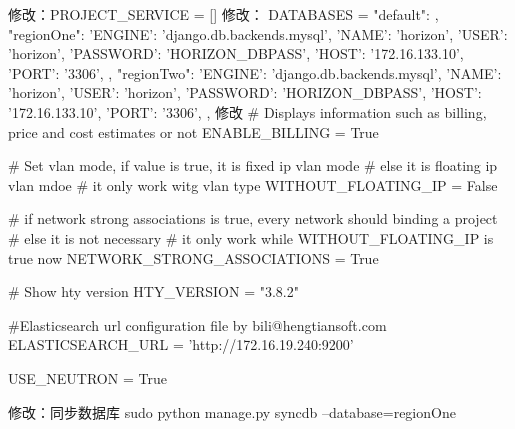 修改：PROJECT_SERVICE = []
修改：
DATABASES = {
    "default": {},
    "regionOne": {
        'ENGINE': 'django.db.backends.mysql',
        'NAME': 'horizon',
        'USER': 'horizon',
        'PASSWORD': 'HORIZON_DBPASS',
        'HOST': '172.16.133.10',
        'PORT': '3306',
    },
    "regionTwo": {
        'ENGINE': 'django.db.backends.mysql',
        'NAME': 'horizon',
        'USER': 'horizon',
        'PASSWORD': 'HORIZON_DBPASS',
        'HOST': '172.16.133.10',
        'PORT': '3306',
    },
}
修改
# Displays information such as billing, price and cost estimates or not
ENABLE_BILLING = True

# Set vlan mode, if value is true, it is fixed ip vlan mode
# else it is floating ip vlan mdoe
# it only work witg vlan type
WITHOUT_FLOATING_IP = False

# if network strong associations is true, every network should binding a project
# else it is not necessary
# it only work while WITHOUT_FLOATING_IP is true now
NETWORK_STRONG_ASSOCIATIONS = True

# Show hty version
HTY_VERSION = "3.8.2"

#Elasticsearch url configuration file by bili@hengtiansoft.com
ELASTICSEARCH_URL = 'http://172.16.19.240:9200'

USE_NEUTRON = True

修改：同步数据库
sudo python manage.py syncdb --database=regionOne



